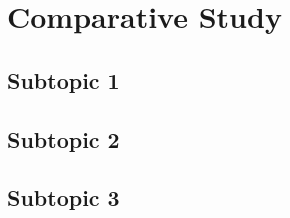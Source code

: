 \chapter{Comparative Study}
\label{chap:Comparative Study}

\section{Subtopic 1}
\label{sec:subtopic1}

\section{Subtopic 2}
\label{sec:subtopic2}

\section{Subtopic 3}
\label{sec:subtopic3}
